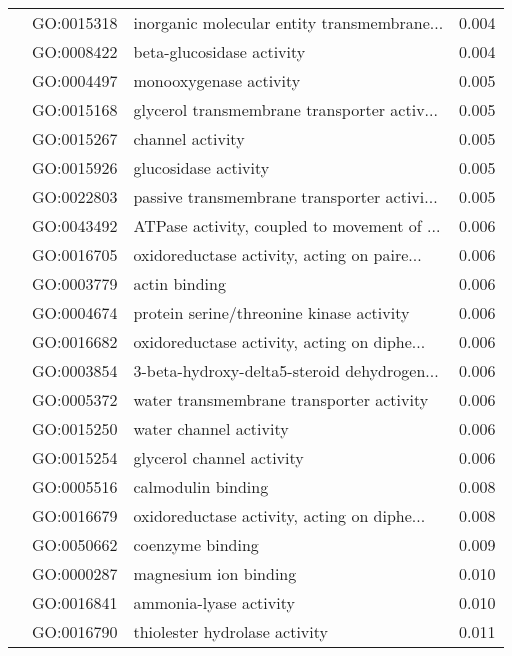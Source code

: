 \begin{longtable}{lllr}
   & GO:0015318 &  inorganic molecular entity transmembrane... &         0.004 \\
   & GO:0008422 &                    beta-glucosidase activity &         0.004 \\
   & GO:0004497 &                       monooxygenase activity &         0.005 \\
   & GO:0015168 &  glycerol transmembrane transporter activ... &         0.005 \\
   & GO:0015267 &                             channel activity &         0.005 \\
   & GO:0015926 &                         glucosidase activity &         0.005 \\
   & GO:0022803 &  passive transmembrane transporter activi... &         0.005 \\
   & GO:0043492 &  ATPase activity, coupled to movement of ... &         0.006 \\
   & GO:0016705 &  oxidoreductase activity, acting on paire... &         0.006 \\
   & GO:0003779 &                                actin binding &         0.006 \\
   & GO:0004674 &     protein serine/threonine kinase activity &         0.006 \\
   & GO:0016682 &  oxidoreductase activity, acting on diphe... &         0.006 \\
   & GO:0003854 &  3-beta-hydroxy-delta5-steroid dehydrogen... &         0.006 \\
   & GO:0005372 &     water transmembrane transporter activity &         0.006 \\
   & GO:0015250 &                       water channel activity &         0.006 \\
   & GO:0015254 &                    glycerol channel activity &         0.006 \\
   & GO:0005516 &                           calmodulin binding &         0.008 \\
   & GO:0016679 &  oxidoreductase activity, acting on diphe... &         0.008 \\
   & GO:0050662 &                             coenzyme binding &         0.009 \\
   & GO:0000287 &                        magnesium ion binding &         0.010 \\
   & GO:0016841 &                       ammonia-lyase activity &         0.010 \\
   & GO:0016790 &                thiolester hydrolase activity &         0.011 \\

\end{longtable}
